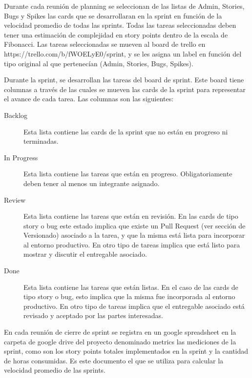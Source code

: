 \documentclass[a4paper,11pt]{article}
\begin{document}
Durante cada reunión de planning se seleccionan de las listas de Admin,
Stories, Bugs y Spikes las cards que se desarrollaran en la sprint en función
de la velocidad promedio de todas las sprints. Todas las tareas seleccionadas
deben tener una estimación de complejidad en story points dentro de la escala
de Fibonacci. Las tareas seleccionadas se mueven al board de trello en
https://trello.com/b/fWOELyE0/sprint, y se les asigna un label en función del
tipo original al que pertenecían (Admin, Stories, Bugs, Spikes).

Durante la sprint, se desarrollan las tareas del board de sprint. Este board
tiene columnas a través de las cuales se mueven las cards de la sprint para
representar el avance de cada tarea. Las columnas son las siguientes:

\begin{description}

  \item[Backlog]

    Esta lista contiene las cards de la sprint que no están en progreso ni
    terminadas.

  \item[In Progress]

    Esta lista contiene las tareas que están en progreso. Obligatoriamente
    deben tener al menos un integrante asignado.

  \item[Review]

    Esta lista contiene las tareas que están en revisión. En las cards de tipo
    story o bug este estado implica que existe un Pull Request (ver sección de
    Versionado) asociado a la tarea, y que la misma está lista para incorporar
    al entorno productivo. En otro tipo de tareas implica que está listo para
    mostrar y discutir el entregable asociado.

  \item[Done]

    Esta lista contiene las tareas que están listas. En el caso de las cards de
    tipo story o bug, esto implica que la misma fue incorporada al entorno
    productivo. En otro tipo de tareas implica que el entregable asociado está
    revisado y aceptado por las partes interesadas.

\end{description}

En cada reunión de cierre de sprint se registra en un google spreadsheet en la
carpeta de google drive del proyecto denominado metrics las mediciones de la
sprint, como son los story points totales implementados en la sprint y la
cantidad de horas consumidas. Es este documento el que se utiliza para calcular
la velocidad promedio de las sprints.
\end{document}
